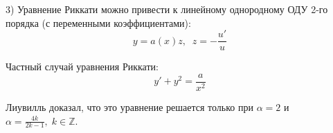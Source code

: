 \documentclass{article}
\begin{document}
	3) Уравнение Риккати можно привести к линейному однородному ОДУ 2-го порядка (с переменными коэффициентами):
	\begin{equation}
		y = a(x)z,\;\;z = -\frac{u'}{u}
	\end{equation}

	Частный случай уравнения Риккати:
	\begin{equation}
		y' + y^2 = \frac{a}{x^2}
	\end{equation}

	Лиувилль доказал, что это уравнение решается только при $\alpha=2$ и $\alpha = \frac{4k}{2k-1},\;k\in\mathbb{Z}$.
\end{document}
